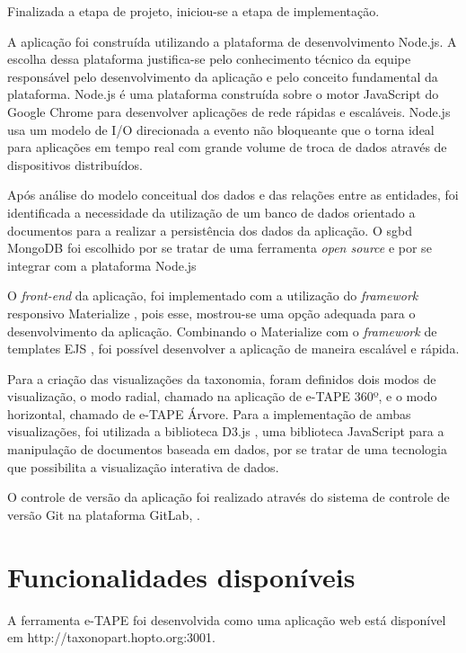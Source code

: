 \par
Finalizada a etapa de projeto, iniciou-se a etapa de implementação. 

A aplicação foi construída utilizando a plataforma de desenvolvimento Node.js. A escolha dessa plataforma justifica-se pelo conhecimento técnico da equipe
responsável pelo desenvolvimento da aplicação e pelo conceito fundamental da plataforma. Node.js é uma plataforma construída sobre o motor JavaScript do 
Google Chrome para desenvolver aplicações de rede rápidas e escaláveis. Node.js usa um modelo de I/O direcionada a evento não bloqueante que o torna
ideal para aplicações em tempo real com grande volume de troca de dados através de dispositivos distribuídos. 
\cite{nodejs}

\par
Após análise do modelo conceitual dos dados e das relações entre as entidades, foi identificada a necessidade da utilização de um banco de dados orientado a documentos para a 
realizar a persistência dos dados da aplicação. 
O \acrfull{sgbd} MongoDB foi escolhido por se tratar de uma ferramenta \textit{open source} e por se integrar com a plataforma Node.js 
\cite{mongodb}

\par
O \textit{front-end} da aplicação, foi implementado com a utilização do \textit{framework} responsivo Materialize \cite{materialize}, pois esse, 
mostrou-se uma opção adequada para o desenvolvimento da aplicação. Combinando o Materialize com o \textit{framework} de templates EJS \cite{ejs}, 
foi possível desenvolver a aplicação de maneira escalável e rápida. 


\par
Para a criação das visualizações da taxonomia, foram definidos dois modos de visualização, o modo radial, chamado na aplicação de e-TAPE 360º, e o modo horizontal, 
chamado de e-TAPE Árvore. Para a implementação de ambas visualizações, foi utilizada a biblioteca D3.js \cite{d3js}, uma biblioteca JavaScript para a manipulação de documentos 
baseada em dados, por se tratar de uma tecnologia que possibilita a visualização interativa de dados.

\par
O controle de versão da aplicação foi realizado através do sistema de controle de versão Git na plataforma GitLab, \cite{gitlab}.

\section{Funcionalidades disponíveis}
\label{sec:funcionamento}
A ferramenta e-TAPE foi desenvolvida como uma aplicação web está disponível em http://taxonopart.hopto.org:3001.

